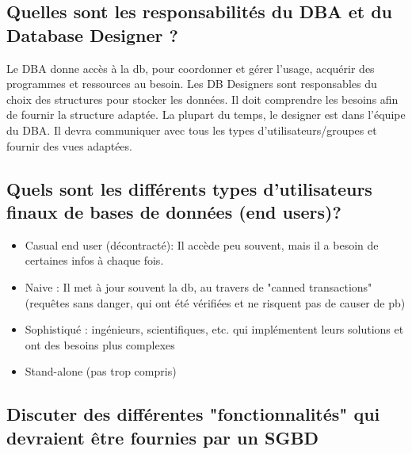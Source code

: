 \subsection{Quelles sont les responsabilités du DBA et du Database Designer ?}
Le DBA donne accès à la db, pour coordonner et gérer l'usage, acquérir des programmes et ressources au besoin. Les DB Designers sont responsables du 
choix des structures pour stocker les données. Il doit comprendre les 
besoins afin de fournir la structure adaptée. La plupart du temps, 
le designer est dans l'équipe du DBA. 
Il devra communiquer avec tous les types d'utilisateurs/groupes et 
fournir des vues adaptées. 


\subsection{Quels sont les différents types d'utilisateurs finaux de bases de données (end users)?}
\begin{itemize}
	\item Casual end user (décontracté): Il accède peu souvent, mais il a besoin de certaines infos à chaque fois.
	\item Naive : Il met à jour souvent la db, au travers de "canned transactions" 
	(requêtes sans danger, qui ont été vérifiées et ne risquent pas de causer de pb)
	\item Sophistiqué : ingénieurs, scientifiques, etc. qui implémentent leurs solutions 
	et ont des besoins plus complexes
	\item Stand-alone (pas trop compris)
\end{itemize}


\subsection{Discuter des différentes "fonctionnalités" qui devraient être fournies par un SGBD}
